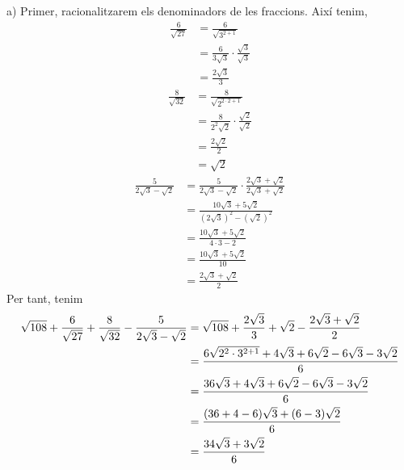 \begin{solucio}
a) Primer, racionalitzarem els denominadors de les fraccions. Així
tenim,%
\begin{align*}
\frac{6}{\sqrt{27}} &=\frac{6}{\sqrt{3^{2+1}}} \\
&=\frac{6}{3\sqrt{3}}\cdot \frac{\sqrt{3}}{\sqrt{3}} \\
&=\frac{2\sqrt{3}}{3}
\end{align*}%
\begin{align*}
\frac{8}{\sqrt{32}} &=\frac{8}{\sqrt{2^{2\cdot 2+1}}} \\
&=\frac{8}{2^{2}\sqrt{2}}\cdot \frac{\sqrt{2}}{\sqrt{2}} \\
&=\frac{2\sqrt{2}}{2} \\
&=\sqrt{2}
\end{align*}%
\begin{align*}
\frac{5}{2\sqrt{3}-\sqrt{2}} &=\frac{5}{2\sqrt{3}-\sqrt{2}}\cdot \frac{2%
\sqrt{3}+\sqrt{2}}{2\sqrt{3}+\sqrt{2}} \\
&=\frac{10\sqrt{3}+5\sqrt{2}}{\left( 2\sqrt{3}\right) ^{2}-\left( \sqrt{2}%
\right) ^{2}} \\
&=\frac{10\sqrt{3}+5\sqrt{2}}{4\cdot 3-2} \\
&=\frac{10\sqrt{3}+5\sqrt{2}}{10} \\
&=\frac{2\sqrt{3}+\sqrt{2}}{2}
\end{align*}%
Per tant, tenim%
\begin{align*}
\sqrt{108}+\frac{6}{\sqrt{27}}+\frac{8}{\sqrt{32}}-\frac{5}{2\sqrt{3}-\sqrt{2%
}} &=\sqrt{108}+\frac{2\sqrt{3}}{3}+\sqrt{2}-\frac{2\sqrt{3}+\sqrt{2}}{2} \\
&=\frac{6\sqrt{2^{2}\cdot 3^{2+1}}+4\sqrt{3}+6\sqrt{2}-6\sqrt{3}-3\sqrt{2}}{%
6} \\
&=\frac{36\sqrt{3}+4\sqrt{3}+6\sqrt{2}-6\sqrt{3}-3\sqrt{2}}{6} \\
&=\frac{(36+4-6)\sqrt{3}+(6-3)\sqrt{2}}{6} \\
&=\frac{34\sqrt{3}+3\sqrt{2}}{6}
\end{align*}


\end{solucio}
